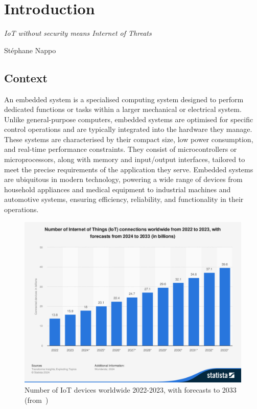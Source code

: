 \chapter{Introduction}
\label{chapter:introduction}

\epigraph{\textit{IoT without security means Internet of Threats}}{Stéphane Nappo}

\minitoc

\section{Context}
An embedded system is a specialised computing system designed to perform dedicated functions or tasks within a larger mechanical or electrical system. Unlike general-purpose computers, embedded systems are optimised for specific control operations and are typically integrated into the hardware they manage. These systems are characterised by their compact size, low power consumption, and real-time performance constraints. They consist of microcontrollers or microprocessors, along with memory and input/output interfaces, tailored to meet the precise requirements of the application they serve. Embedded systems are ubiquitous in modern technology, powering a wide range of devices from household appliances and medical equipment to industrial machines and automotive systems, ensuring efficiency, reliability, and functionality in their operations.

\begin{figure}[ht]
    \centering
    \includegraphics[width=\linewidth, trim={1.25cm 4.75cm 1cm 3.75cm}, clip]{c1_intro/img/iot_forecasts.pdf}
    \caption{Number of IoT devices worldwide 2022-2023, with forecasts to 2033 (from~\cite{statista_iot})}
    \label{fig:iot_forecasts}
\end{figure}

